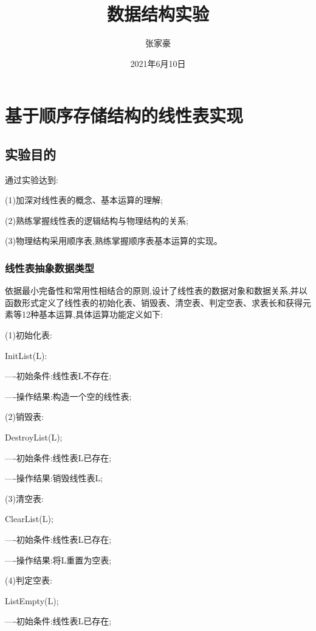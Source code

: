 \documentclass[supercite]{Experimental_Report}
\title{~~~~~~数据结构实验~~~~~~}
\author{张家豪}
\date{2021年6月10日}
\theoremstyle{definition}
\begin{document}
\maketitle

\clearpage


\tableofcontents[level=2]

\clearpage


\section{基于顺序存储结构的线性表实现}

\subsection{实验目的}

通过实验达到:

(1)加深对线性表的概念、基本运算的理解;

(2)熟练掌握线性表的逻辑结构与物理结构的关系;

(3)物理结构采用顺序表,熟练掌握顺序表基本运算的实现。

\subsubsection{线性表抽象数据类型}

依据最小完备性和常用性相结合的原则,设计了线性表的数据对象和数据关系,并以函数形式定义了线性表的初始化表、销毁表、清空表、判定空表、求表长和获得元素等12种基本运算,具体运算功能定义如下:

(1)初始化表:

InitList(L):

----初始条件:线性表L不存在;

----操作结果:构造一个空的线性表;

(2)销毁表:

DestroyList(L);

----初始条件:线性表L已存在;

----操作结果:销毁线性表L;

(3)清空表:

ClearList(L);

----初始条件:线性表L已存在;

----操作结果:将L重置为空表;

(4)判定空表:

ListEmpty(L);

----初始条件:线性表L已存在;
\end{document}
